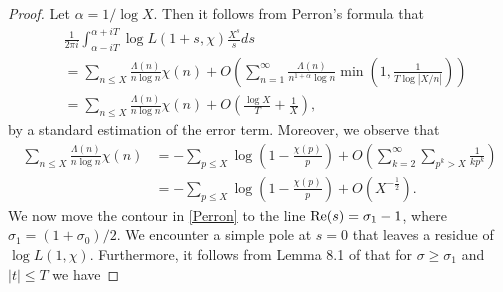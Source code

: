 \documentclass[12pt]{amsart}
\theoremstyle{definition}
\numberwithin{equation}{section}
\newcommand{\re}{\textup{Re}}
\begin{document}
\begin{proof}
Let $\alpha=1/\log X$. Then it follows from Perron's formula that
\begin{equation}\label{Perron}
\begin{aligned}
&\frac{1}{2\pi i} \int_{\alpha-iT}^{\alpha+iT} \log L(1+s, \chi) \frac{X^s}{s} ds\\
& = \sum_{n\leq X} \frac{\Lambda(n)}{n\log n}\chi(n)+ O\left(\sum_{n=1}^{\infty} \frac{\Lambda(n)}{n^{1+\alpha}\log n}\min\left(1, \frac{1}{T\log|X/n|}\right)\right)\\
&= \sum_{n\leq X} \frac{\Lambda(n)}{n\log n}\chi(n)+ O\left(\frac{\log X}{T}+ \frac{1}{X}\right),
\end{aligned}
\end{equation}
by a standard estimation of the error term. Moreover, we observe that 
\begin{align*}
 \sum_{n\leq X} \frac{\Lambda(n)}{n\log n}\chi(n)&= -\sum_{p\leq X} \log \left(1-\frac{\chi(p)}{p}\right)+O\left(\sum_{k=2}^{\infty}\sum_{p^k>X} \frac{1}{k p^k}\right)\\
 &=-\sum_{p \leq X} \log\left(1-\frac{\chi(p)}{p}\right) + O\left(X^{-\frac{1}{2}}\right).
\end{align*}
We now move the contour in \eqref{Perron} to the line $\re(s)=\sigma_1-1$, where $\sigma_1=(1+\sigma_0)/2$. We encounter a simple pole at $s=0$ that leaves a residue of $\log L(1, \chi)$. Furthermore, it follows from Lemma 8.1 of \cite{GrSo0} that for $\sigma\geq \sigma_1$ and $|t|\leq T$ we have 

\end{proof}
\end{document}
